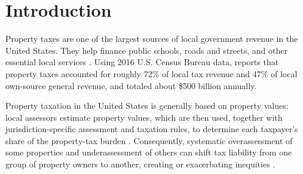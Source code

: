 \documentclass[10pt]{article}
\theoremstyle{definition}
\newcommand{\1}{\mathbf{1}}
\newcommand{\oldtext}[1]{\textcolor{blue}{\sout{#1}}}
\newcommand{\newtext}[1]{\textcolor{impGreen}{#1}}
\begin{document}
\begin{abstract}
\newtext{A fixed-prediction-space analysis clarifies that the two objectives are related but not equivalent: the Direct penalty follows a rank-one covariance-correction path, whereas the Surrogate is a log-price-distance-weighted projection that can combine multiple learnable correction directions. Exploratory multi-jurisdiction analyses separately examine transferability and heterogeneity. We report complete regularization paths and do not select a deployment penalty strength.}

\end{abstract}



\section{Introduction}
\label{sec:introduction}

Property taxes are one of the largest sources of local government revenue in the United States. They help finance public schools, roads and streets, and other essential local services \cite{IAAO2020PropertyTaxPolicy}. Using 2016 U.S. Census Bureau data, \textcite{Berry2021} reports that property taxes accounted for roughly 72\% of local tax revenue and 47\% of local own-source general revenue, and totaled about \$500 billion annually.

{Property taxation in the United States is generally based on property values}: local assessors estimate property values, which are then used, together with jurisdiction-specific assessment and taxation rules, to determine each taxpayer's share of the property-tax burden \cite{IAAO2020PropertyTaxPolicy,IAAO2025Mass}. Consequently, systematic overassessment of some properties and underassessment of others can shift tax liability from one group of property owners to another, creating or exacerbating inequities \cite{Berry2021,IAAO2020PropertyTaxPolicy}.
\end{document}
